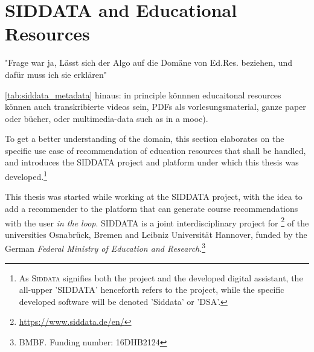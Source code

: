 


\section{SIDDATA and Educational Resources}
\label{sec:siddata}


"Frage war ja, Lässt sich der Algo auf die Domäne von Ed.Res. beziehen, und dafür muss ich sie erklären"

 \ref{tab:siddata_metadata} hinaus: in principle könnnen educaitonal resources können auch transkribierte videos sein, PDFs als vorlesungsmaterial, ganze paper oder bücher, oder multimedia-data such as in a mooc). 



To get a better understanding of the domain, this section elaborates on the specific use case of recommendation of education resources that shall be handled, and introduces the SIDDATA project and platform under which this thesis was developed.\footnote{As \textsc{Siddata} signifies both the project and the developed digital assistant, the all-upper 'SIDDATA' henceforth refers to the project, while the specific developed software will be denoted 'Siddata' or 'DSA'.}

This thesis was started while working at the SIDDATA project, with the idea to add a recommender to the platform that can generate course recommendations with the user \textit{in the loop}. SIDDATA is a joint interdisciplinary project for \footnote{\url{https://www.siddata.de/en/}} of the universities Osnabrück, Bremen and Leibniz Universität Hannover, funded by the German \emph{Federal Ministry of Education and Research}.\footnote{BMBF. Funding number: 16DHB2124} 

